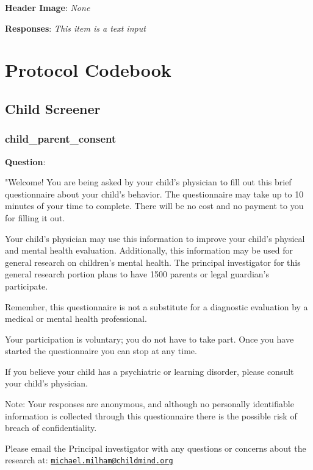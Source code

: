 \documentclass[]{book}
\begin{document}
\textbf{Header Image}: \emph{None}

\textbf{Responses}: \emph{This item is a text input}

\hypertarget{part-protocol-codebook-1}{%
\part{Protocol Codebook}\label{part-protocol-codebook-1}}

\hypertarget{child-screener}{%
\chapter{Child Screener}\label{child-screener}}

\hypertarget{child_parent_consent}{%
\section{child\_parent\_consent}\label{child_parent_consent}}

\textbf{Question}:

"Welcome! You are being asked by your child's physician to fill out this brief questionnaire about your child's behavior. The questionnaire may take up to 10 minutes of your time to complete. There will be no cost and no payment to you for filling it out.

Your child's physician may use this information to improve your child's physical and mental health evaluation. Additionally, this information may be used for general research on children's mental health. The principal investigator for this general research portion plans to have 1500 parents or legal guardian's participate.

Remember, this questionnaire is not a substitute for a diagnostic evaluation by a medical or mental health professional.

Your participation is voluntary; you do not have to take part. Once you have started the questionnaire you can stop at any time.

If you believe your child has a psychiatric or learning disorder, please consult your child's physician.

Note: Your responses are anonymous, and although no personally identifiable information is collected through this questionnaire there is the possible risk of breach of confidentiality.

Please email the Principal investigator with any questions or concerns about the research at: \href{mailto:michael.milham@childmind.org}{\nolinkurl{michael.milham@childmind.org}}
\end{document}
